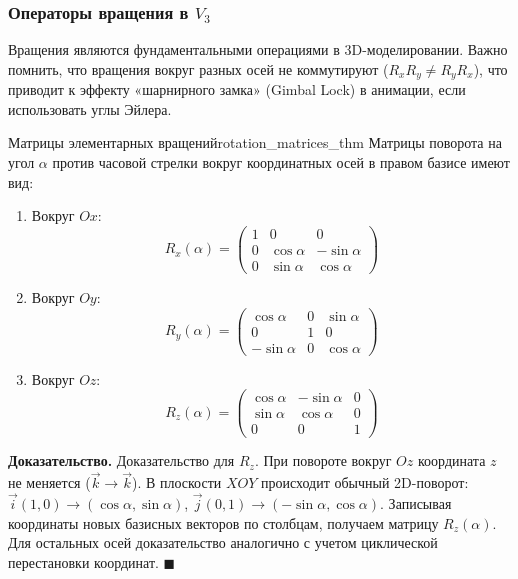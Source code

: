 \documentclass[12pt,a4paper]{article}
\newenvironment{myproof}{\noindent\textbf{Доказательство.}}{\hfill$\blacksquare$}
\begin{document}
  \subsubsection*{Операторы вращения в $V_3$}

  Вращения являются фундаментальными операциями в 3D-моделировании.
  Важно помнить, что вращения вокруг разных осей не коммутируют ($R_x
  R_y \neq R_y R_x$), что приводит к эффекту «шарнирного замка»
  (Gimbal Lock) в анимации, если использовать углы Эйлера.

  \begin{theorem}{Матрицы элементарных вращений}{rotation_matrices_thm}
    Матрицы поворота на угол $\alpha$ против часовой стрелки вокруг
    координатных осей в правом базисе имеют вид:
    \begin{enumerate}
      \item Вокруг $Ox$:
        \[
          R_x(\alpha) =
          \begin{pmatrix} 1 & 0 & 0 \\ 0 & \cos\alpha & -\sin\alpha
            \\ 0 & \sin\alpha & \cos\alpha
          \end{pmatrix}
        \]
      \item Вокруг $Oy$:
        \[
          R_y(\alpha) =
          \begin{pmatrix} \cos\alpha & 0 & \sin\alpha \\ 0 & 1 & 0
            \\ -\sin\alpha & 0 & \cos\alpha
          \end{pmatrix}
        \]
      \item Вокруг $Oz$:
        \[
          R_z(\alpha) =
          \begin{pmatrix} \cos\alpha & -\sin\alpha & 0 \\ \sin\alpha
            & \cos\alpha & 0 \\ 0 & 0 & 1
          \end{pmatrix}
        \]
    \end{enumerate}
  \end{theorem}

  \begin{myproof}
    Доказательство для $R_z$. При повороте вокруг $Oz$ координата $z$
    не меняется ($\vec{k} \to \vec{k}$). В плоскости $XOY$ происходит
    обычный 2D-поворот:
    $\vec{i}(1,0) \to (\cos\alpha, \sin\alpha)$,
    $\vec{j}(0,1) \to (-\sin\alpha, \cos\alpha)$.
    Записывая координаты новых базисных векторов по столбцам,
    получаем матрицу $R_z(\alpha)$. Для остальных осей доказательство
    аналогично с учетом циклической перестановки координат.
  \end{myproof}
\end{document}
